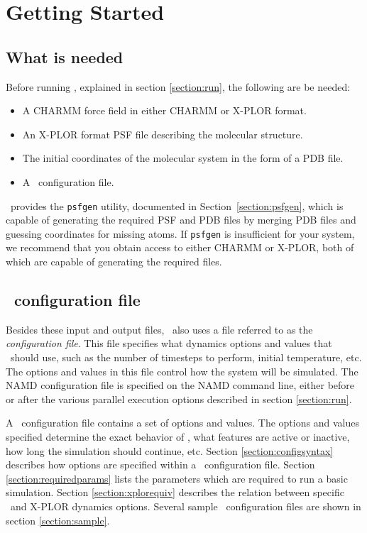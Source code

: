 
\section{Getting Started}
\label{section:start}

\subsection{What is needed}

Before running \NAMD, explained in section \ref{section:run}, 
the following are be needed:
\begin{itemize}
\item A CHARMM force field in either CHARMM or X-PLOR format.
\item
An X-PLOR format PSF file describing the molecular structure.
\item
The initial coordinates of the molecular system in the form of a PDB file.  
\item
A \NAMD\ configuration file.
\end{itemize}

\NAMD\ provides the \verb#psfgen# utility,
documented in Section~\ref{section:psfgen},
which is capable of generating the required PSF and PDB files by
merging PDB files and guessing coordinates for missing atoms.
If \verb#psfgen# is insufficient for your system,
we recommend that you obtain access to either CHARMM or X-PLOR,
both of which are capable of generating the required files.

\subsection{\NAMD\ configuration file}
\label{section:config}

Besides these input and output files, \NAMD\ also uses 
a file referred to as the {\it configuration file\/}.  
This file specifies what dynamics options and values that 
\NAMD\ should use, such as the number of timesteps to perform, 
initial temperature, etc.  
The options and values in this file control how 
the system will be simulated.  
The NAMD configuration file is specified on the NAMD command line,
either before or after the various parallel execution options described
in section \ref{section:run}.

A \NAMD\ configuration file contains a set of options and values.  
The options and values specified determine the exact behavior of
\NAMD, what features are active or inactive, how long the simulation
should continue, etc.  Section \ref{section:configsyntax} describes how
options are specified within a \NAMD\ configuration file.  Section
\ref{section:requiredparams} lists the parameters which are required
to run a basic simulation.  Section \ref{section:xplorequiv}
describes the relation between specific \NAMD\ and X-PLOR dynamics
options.  Several sample \NAMD\ configuration files are shown
in section \ref{section:sample}.

